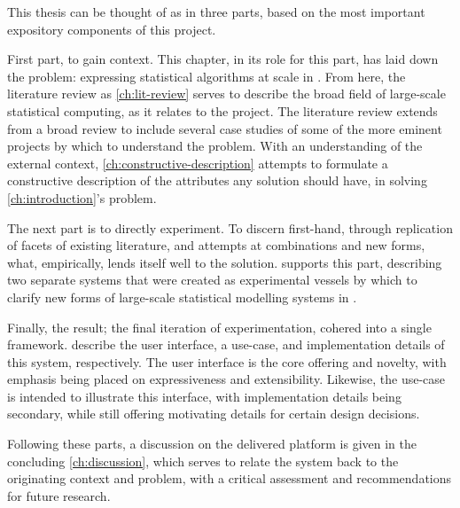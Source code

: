 This thesis can be thought of as in three parts, based on the most important expository components of this project.

First part, to gain context.
This chapter, in its role for this part, has laid down the problem: expressing statistical algorithms at scale in \R{}.
From here, the literature review as \cref{ch:lit-review} serves to describe the broad field of large-scale statistical computing, as it relates to the \lsr{} project.
The literature review extends from a broad review to include several case studies of some of the more eminent projects by which to understand the problem.
With an understanding of the external context, \cref{ch:constructive-description} attempts to formulate a constructive description of the attributes any solution should have, in solving \cref{ch:introduction}'s problem.

The next part is to directly experiment.
To discern first-hand, through replication of facets of existing literature, and attempts at combinations and new forms, what, empirically, lends itself well to the solution.
 supports this part, describing two separate systems that were created as experimental vessels by which to clarify new forms of large-scale statistical modelling systems in \R{}.

Finally, the result; the final iteration of experimentation, cohered into a single \lsr{} framework.
 describe the user interface, a use-case, and implementation details of this system, respectively.
The user interface is the core offering and novelty, with emphasis being placed on expressiveness and extensibility.
Likewise, the use-case is intended to illustrate this interface, with implementation details being secondary, while still offering motivating details for certain design decisions.

Following these parts, a discussion on the delivered platform is given in the concluding \cref{ch:discussion}, which serves to relate the \lsr{} system back to the originating context and problem, with a critical assessment and recommendations for future research.
